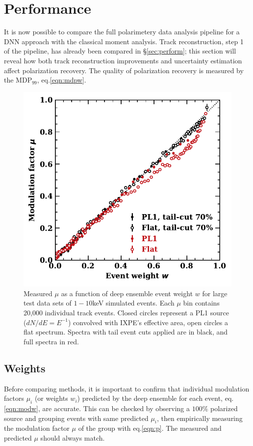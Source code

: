 \section{Performance}
\label{sec:perform2}
It is now possible to compare the full polarimetery data analysis pipeline for a DNN approach with the classical moment analysis. Track reconstruction, step 1 of the pipeline, has already been compared in \S\ref{sec:perform}; this section will reveal how both track reconstruction improvements and uncertainty estimation affect polarization recovery. The quality of polarization recovery is measured by the MDP$_{99}$, eq.\ref{eqn:mdpw}. 

\begin{figure}[t]
\centering
\includegraphics[scale=.8]{figures/mu100_v_W2_text.pdf}
\caption{Measured $\mu$ as a function of deep ensemble event weight $w$ for large test data sets of $1-10$keV simulated events. Each $\mu$ bin contains 20,000 individual track events. Closed circles represent a PL1 source ($dN/dE = E^{-1}$) convolved with IXPE's effective area, open circles a flat spectrum. Spectra with tail event cuts applied are in black, and full spectra in red.}
\label{fig:weight2}       %
\end{figure}

\subsection{Weights}
Before comparing methods, it is important to confirm that individual modulation factors $\mu_i$ (or weights $w_i$) predicted by the deep ensemble for each event, eq.\ref{eqn:modw}, are accurate. This can be checked by observing a $100\%$ polarized source and grouping events with same predicted $\mu_i$, then empirically measuring the modulation factor $\mu$ of the group with eq.\ref{eqn:p}. The measured and predicted $\mu$ should always match.

